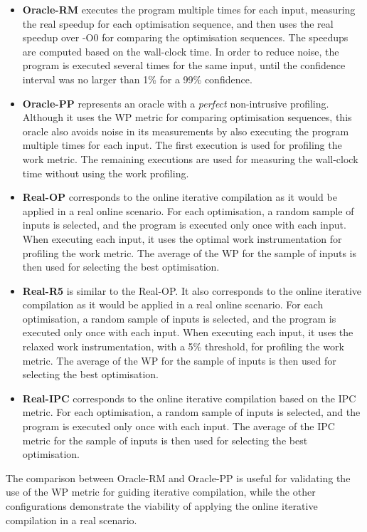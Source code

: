 \documentclass[sigplan,10pt]{acmart}
\theoremstyle{definition}
\newcommand{\itercomp}{{iterative compilation}}
\newcommand{\flagstype}{\usefont{T1}{cmr}{m}{n}}
\begin{document}
\begin{itemize}
\item \textbf{Oracle-RM} executes the program multiple times for each input, measuring the real speedup for each optimisation sequence, and then uses the real speedup over {\flagstype -O0} for comparing the optimisation sequences.
  The speedups are computed based on the wall-clock time.
  In order to reduce noise, the program is executed several times for the same input, until the confidence interval was no larger than 1\% for a 99\% confidence.
\newpage
\item \textbf{Oracle-PP} represents an oracle with a \textit{perfect} non-intrusive profiling.
  Although it uses the WP metric for comparing optimisation sequences, this oracle also avoids noise in its measurements by also executing the program multiple times for each input.
  The first execution is used for profiling the work metric.
  The remaining executions are used for measuring the wall-clock time without using the work profiling.
\item \textbf{Real-OP} corresponds to the online {\itercomp} as it would be applied in a real online scenario.
  For each optimisation, a random sample of inputs is selected, and the program is executed only once with each input.
  When executing each input, it uses the optimal work instrumentation for profiling the work metric.
  The average of the WP for the sample of inputs is then used for selecting the best optimisation.
\item \textbf{Real-R5} is similar to the {Real-OP}.
  It also corresponds to the online {\itercomp} as it would be applied in a real online scenario.
  For each optimisation, a random sample of inputs is selected, and the program is executed only once with each input.
  When executing each input, it uses the relaxed work instrumentation, with a 5\% threshold, for profiling the work metric.
  The average of the WP for the sample of inputs is then used for selecting the best optimisation.
\item \textbf{Real-IPC} corresponds to the online {\itercomp} based on the IPC metric.
  For each optimisation, a random sample of inputs is selected, and the program is executed only once with each input.
  The average of the IPC metric for the sample of inputs is then used for selecting the best optimisation.
\end{itemize}
The comparison between Oracle-RM and Oracle-PP is useful for validating the use of the WP metric for guiding {\itercomp}, while the other configurations demonstrate the viability of applying the online {\itercomp} in a real scenario.
\end{document}
